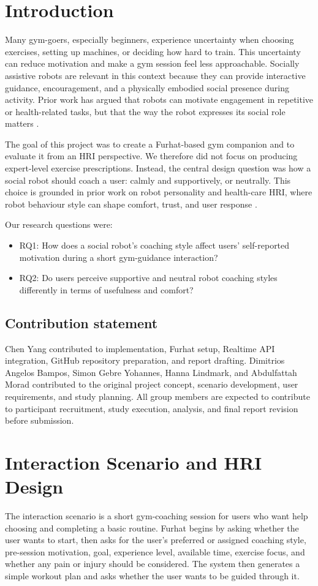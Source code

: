 \documentclass[conference, onecolumn]{IEEEtran}
\begin{document}
\section{Introduction}
Many gym-goers, especially beginners, experience uncertainty when choosing exercises, setting up machines, or deciding how hard to train. This uncertainty can reduce motivation and make a gym session feel less approachable. Socially assistive robots are relevant in this context because they can provide interactive guidance, encouragement, and a physically embodied social presence during activity. Prior work has argued that robots can motivate engagement in repetitive or health-related tasks, but that the way the robot expresses its social role matters \cite{andrist2015look,sussenbach2014robot}.

The goal of this project was to create a Furhat-based gym companion and to evaluate it from an HRI perspective. We therefore did not focus on producing expert-level exercise prescriptions. Instead, the central design question was how a social robot should coach a user: calmly and supportively, or neutrally. This choice is grounded in prior work on robot personality and health-care HRI, where robot behaviour style can shape comfort, trust, and user response \cite{esterwood2021systematic}.

Our research questions were:
\begin{itemize}
    \item RQ1: How does a social robot's coaching style affect users' self-reported motivation during a short gym-guidance interaction?
    \item RQ2: Do users perceive supportive and neutral robot coaching styles differently in terms of usefulness and comfort?
\end{itemize}

\subsection{Contribution statement}
Chen Yang contributed to implementation, Furhat setup, Realtime API integration, GitHub repository preparation, and report drafting. Dimitrios Angelos Bampos, Simon Gebre Yohannes, Hanna Lindmark, and Abdulfattah Morad contributed to the original project concept, scenario development, user requirements, and study planning. All group members are expected to contribute to participant recruitment, study execution, analysis, and final report revision before submission.

\section{Interaction Scenario and HRI Design}
The interaction scenario is a short gym-coaching session for users who want help choosing and completing a basic routine. Furhat begins by asking whether the user wants to start, then asks for the user's preferred or assigned coaching style, pre-session motivation, goal, experience level, available time, exercise focus, and whether any pain or injury should be considered. The system then generates a simple workout plan and asks whether the user wants to be guided through it.
\end{document}
